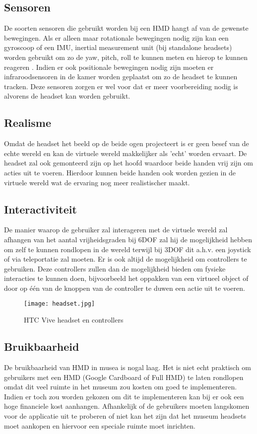 \subsection{Sensoren}
De soorten sensoren die gebruikt worden bij een HMD hangt af van de gewenste bewegingen. Als er alleen maar rotationale bewegingen nodig zijn kan een gyroscoop of een IMU, inertial measurement unit (bij standalone headsets) worden gebruikt om zo de yaw, pitch, roll te kunnen meten en hierop te kunnen reageren \autocite{LaValle2014}. Indien er ook positionale bewegingen nodig zijn moeten er infraroodsensoren in de kamer worden geplaatst om zo de headset te kunnen tracken. Deze sensoren zorgen er wel voor dat er meer voorbereiding nodig is alvorens de headset kan worden gebruikt.
\subsection{Realisme}
Omdat de headset het beeld op de beide ogen projecteert is er geen besef van de echte wereld en kan de virtuele wereld makkelijker als 'echt' worden ervaart. De headset zal ook gemonteerd zijn op het hoofd waardoor beide handen vrij zijn om acties uit te voeren. Hierdoor kunnen beide handen ook worden gezien in de virtuele wereld wat de ervaring nog meer realistischer maakt.
\subsection{Interactiviteit}
De manier waarop de gebruiker zal interageren met de virtuele wereld zal afhangen van het aantal vrijheidsgraden bij 6DOF zal hij de mogelijkheid hebben om zelf te kunnen rondlopen in de wereld terwijl bij 3DOF dit a.h.v. een joystick of via teleportatie zal moeten. Er is ook altijd de mogelijkheid om controllers te gebruiken. Deze controllers zullen dan de mogelijkheid bieden om fysieke interacties te kunnen doen, bijvoorbeeld het oppakken van een virtueel object of door op één van de knoppen van de controller te duwen een actie uit te voeren.

\begin{figure}
    \texttt{[image: headset.jpg]}
    \caption{HTC Vive headset en controllers}
    \label{fig:htcvive}
\end{figure}

\subsection{Bruikbaarheid}
De bruikbaarheid van HMD in musea is nogal laag. Het is niet echt praktisch om gebruikers met een HMD (Google Cardboard of Full HMD) te laten rondlopen omdat dit veel ruimte in het museum zou kosten om goed te implementeren. Indien er toch zou worden gekozen om dit te implementeren kan bij er ook een hoge financiele kost aanhangen. Afhankelijk of de gebruikers moeten langskomen voor de applicatie uit te proberen of niet kan het zijn dat het museum headsets moet aankopen en hiervoor een speciale ruimte moet inrichten.


